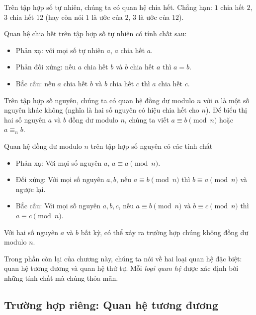 \begin{example}
    Trên tập hợp số tự nhiên, chúng ta có quan hệ chia hết. Chẳng hạn: $1$ chia hết $2$, $3$ chia hết $12$ (hay còn nói $1$ là ước của $2$, $3$ là ước của $12$).

    Quan hệ chia hết trên tập hợp số tự nhiên có tính chất sau:
    \begin{itemize}
        \item Phản xạ: với mọi số tự nhiên $a$, $a$ chia hết $a$.
        \item Phản đối xứng: nếu $a$ chia hết $b$ và $b$ chia hết $a$ thì $a = b$.
        \item Bắc cầu: nếu $a$ chia hết $b$ và $b$ chia hết $c$ thì $a$ chia hết $c$.
    \end{itemize}
\end{example}

\begin{example}\label{example:congruence}
    Trên tập hợp số nguyên, chúng ta có quan hệ đồng dư modulo $n$ với $n$ là một số nguyên khác không (nghĩa là hai số nguyên có hiệu chia hết cho $n$). Để biểu thị hai số nguyên $a$ và $b$ đồng dư modulo $n$, chúng ta viết $a\equiv b\pmod{n}$ hoặc $a\equiv_{n} b$.

    \noindent Quan hệ đồng dư modulo $n$ trên tập hợp số nguyên có các tính chất
    \begin{itemize}
        \item Phản xạ: Với mọi số nguyên $a$, $a\equiv a\pmod{n}$.
        \item Đối xứng: Với mọi số nguyên $a, b$, nếu $a\equiv b\pmod{n}$ thì $b\equiv a\pmod{n}$ và ngược lại.
        \item Bắc cầu: Với mọi số nguyên $a, b, c$, nếu $a\equiv b\pmod{n}$ và $b\equiv c\pmod{n}$ thì $a\equiv c\pmod{n}$.
    \end{itemize}

    Với hai số nguyên $a$ và $b$ bất kỳ, có thể xảy ra trường hợp chúng không đồng dư modulo $n$.
\end{example}

Trong phần còn lại của chương này, chúng ta nói về hai loại quan hệ đặc biệt: quan hệ tương đương và quan hệ thứ tự. Mỗi \textit{loại quan hệ} được xác định bởi những tính chất mà chúng thỏa mãn.

\subsection{Trường hợp riêng: Quan hệ tương đương}

